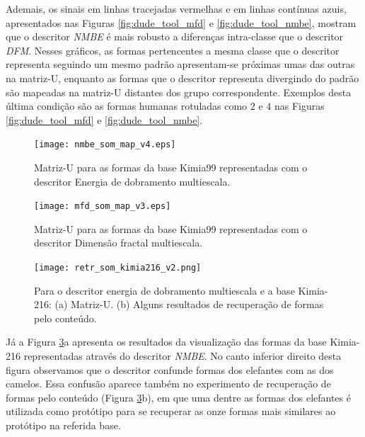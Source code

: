 Ademais, os sinais em linhas tracejadas vermelhas e em linhas contínuas azuis, apresentados nas Figuras \ref{fig:dude_tool_mfd} e \ref{fig:dude_tool_nmbe}, mostram que o descritor \emph{NMBE} é mais robusto a diferenças intra-classe que o descritor \emph{DFM}. Nesses gráficos, as formas pertencentes a mesma classe que o descritor representa seguindo um mesmo padrão apresentam-se próximas umas das outras na matriz-U, enquanto as formas que o descritor representa divergindo do padrão são mapeadas na matriz-U distantes dos grupo correspondente. Exemplos desta última condição são as formas humanas rotuladas como $2$ e $4$ nas Figuras \ref{fig:dude_tool_mfd} e \ref{fig:dude_tool_nmbe}.

\begin{figure}[h!]
  \caption{\label{fig:nmbe_som_map} Matriz-U para as formas da base Kimia99 representadas com o descritor Energia de dobramento multiescala.}
  \centering
  \texttt{[image: nmbe\_som\_map\_v4.eps]}
\end{figure}

\begin{figure}[h!]
  \caption{\label{fig:mfd_som_map} Matriz-U para as formas da base Kimia99 representadas com o descritor Dimensão fractal multiescala.}
  \centering
  \texttt{[image: mfd\_som\_map\_v3.eps]}
\end{figure}
  
\begin{figure}[h!]  \caption{\label{fig:som_kimia_216} Para o descritor energia de dobramento multiescala e a base Kimia-216: (a) Matriz-U. (b) Alguns resultados de recuperação de formas pelo conteúdo.}
  \centering
  \texttt{[image: retr\_som\_kimia216\_v2.png]}
\end{figure}

Já a Figura \ref{fig:som_kimia_216}a apresenta os resultados da visualização das formas da base Kimia-216 representadas através do descritor \emph{NMBE}. No canto inferior direito desta figura observamos que o descritor confunde formas dos elefantes com as dos camelos. Essa confusão aparece também no experimento de recuperação de formas pelo conteúdo (Figura \ref{fig:som_kimia_216}b), em que uma dentre as formas dos elefantes é utilizada como protótipo para se recuperar as onze formas mais similares ao protótipo na referida base.

